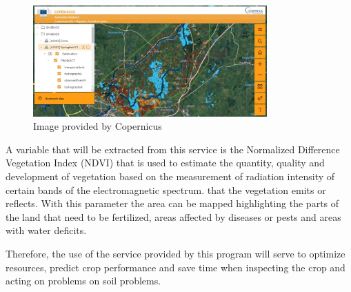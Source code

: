 \begin{itemize}
    \begin{figure}
    	\centering
    	\includegraphics[width=0.8\textwidth]{images/copernicus.jpeg}
    	\caption{Image provided by Copernicus}
    	\label{fig:copernicus}
    \end{figure} 
    
    A variable that will be extracted from this service is the Normalized Difference Vegetation Index (NDVI) that is used to estimate the quantity, quality and development of vegetation based on the measurement of radiation intensity of certain bands of the electromagnetic spectrum. that the vegetation emits or reflects. With this parameter the area can be mapped highlighting the parts of the land that need to be fertilized, areas affected by diseases or pests and areas with water deficits.
    
    Therefore, the use of the service provided by this program will serve to optimize resources, predict crop performance and save time when inspecting the crop and acting on problems on soil problems.
    
    
\end{itemize}
